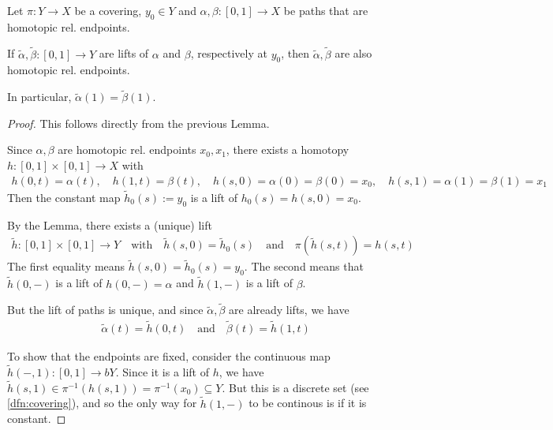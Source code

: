 \begin{cor}\label{cor:monodromy}
  Let $\pi: Y \to X$ be a covering, $y_0 \in Y$ and $\alpha,\beta:[0,1] \to X$ be paths that are homotopic rel. endpoints.

  If $\tilde{\alpha},\tilde{\beta}:[0,1] \to Y$ are lifts of $\alpha$ and $\beta$, respectively at $y_0$, then $\tilde{\alpha}, \tilde{\beta}$ are also homotopic rel. endpoints.

  In particular, $\tilde{\alpha}(1) = \tilde{\beta}(1)$.
\end{cor}
\begin{proof}
  This follows directly from the previous Lemma.

Since $\alpha,\beta$ are homotopic rel. endpoints $x_0,x_1$, there exists a homotopy
$h: [0,1] \times [0,1] \to X$ with
\begin{align*}
  h(0,t) = \alpha(t), 
  \quad
  h(1,t) = \beta(t), 
  \quad
  h(s,0) = \alpha(0) = \beta(0)
  = x_0, 
  \quad
  h(s,1) = \alpha(1) = \beta(1) = x_1
\end{align*}
Then the constant map $\tilde{h}_0(s) := y_0$ is a lift of $h_0(s) = h(s,0) = x_0$.

By the Lemma, there exists a (unique) lift
\begin{align*}
  \tilde{h}:[0,1] \times[0,1] \to Y \quad \text{with} \quad 
  \tilde{h}(s,0) = \tilde{h}_0(s) \quad \text{and} \quad \pi(\tilde{h}(s,t)) = h(s,t)
\end{align*}
The first equality means $\tilde{h}(s,0) =  \tilde{h}_0(s) = y_0$.
The second means that $\tilde{h}(0,-)$ is a lift of $h(0,-) = \alpha$ and $\tilde{h}(1,-)$ is a lift of $\beta$.

But the lift of paths is unique, and since $\tilde{\alpha},\tilde{\beta}$ are already lifts, we have
\begin{align*}
  \tilde{\alpha}(t) = \tilde{h}(0,t) \quad \text{and} \quad \tilde{\beta}(t) = \tilde{h}(1,t)
\end{align*}

To show that the endpoints are fixed, consider 
the continuous map $\tilde{h}(-,1): [0,1] \to bY$. 
Since it is a lift of $h$, we have $\tilde{h}(s,1) \in \pi^{-1}(h(s,1)) = \pi^{-1}(x_0)\subseteq Y$.
But this is a discrete set (see \ref{dfn:covering}), and so the only way for $\tilde{h}(1,-)$ to be continous is if it is constant.
\end{proof}





